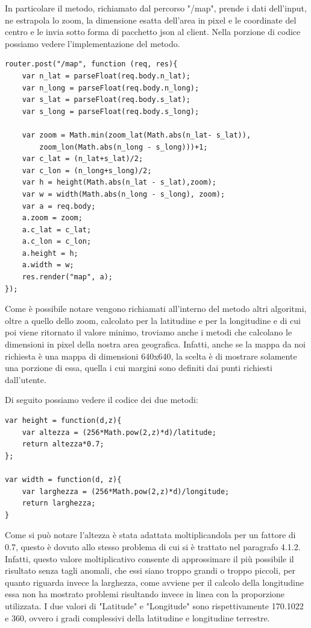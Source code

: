 In particolare il metodo, richiamato dal percorso "/map", prende i dati dell'input, ne estrapola lo zoom, la dimensione esatta dell'area in pixel e le coordinate del centro e le invia sotto forma di pacchetto json al client. Nella porzione di codice possiamo vedere l'implementazione del metodo.
\begin{verbatim}
router.post("/map", function (req, res){
    var n_lat = parseFloat(req.body.n_lat);
    var n_long = parseFloat(req.body.n_long);
    var s_lat = parseFloat(req.body.s_lat);
    var s_long = parseFloat(req.body.s_long);

    var zoom = Math.min(zoom_lat(Math.abs(n_lat- s_lat)),
        zoom_lon(Math.abs(n_long - s_long)))+1;
    var c_lat = (n_lat+s_lat)/2;
    var c_lon = (n_long+s_long)/2;
    var h = height(Math.abs(n_lat - s_lat),zoom);
    var w = width(Math.abs(n_long - s_long), zoom);
    var a = req.body;
    a.zoom = zoom;
    a.c_lat = c_lat;
    a.c_lon = c_lon;
    a.height = h;
    a.width = w;
    res.render("map", a);
});
\end{verbatim}
Come è possibile notare vengono richiamati all'interno del metodo altri algoritmi, oltre a quello dello zoom, calcolato per la latitudine e per la longitudine e di cui poi viene ritornato il valore minimo, troviamo anche i metodi che calcolano le dimensioni in pixel della nostra area geografica. Infatti, anche se la mappa da noi richiesta è una mappa di dimensioni 640x640, la scelta è di mostrare solamente una porzione di essa, quella i cui margini sono definiti dai punti richiesti dall'utente.

Di seguito possiamo vedere il codice dei due metodi:
\begin{verbatim}
var height = function(d,z){
    var altezza = (256*Math.pow(2,z)*d)/latitude;
    return altezza*0.7;
};

var width = function(d, z){
    var larghezza = (256*Math.pow(2,z)*d)/longitude;
    return larghezza;
}
\end{verbatim}
Come si può notare l'altezza è stata adattata moltiplicandola per un fattore di 0.7, questo è dovuto allo stesso problema di cui si è trattato nel paragrafo 4.1.2. Infatti, questo valore moltiplicativo consente di approssimare il più possibile il risultato senza tagli anomali, che essi siano troppo grandi o troppo piccoli, per quanto riguarda invece la larghezza, come avviene per il calcolo della longitudine essa non ha mostrato problemi risultando invece in linea con la proporzione utilizzata. I due valori di "Latitude" e "Longitude" sono rispettivamente 170.1022 e 360, ovvero i gradi complessivi della latitudine e longitudine terrestre.

